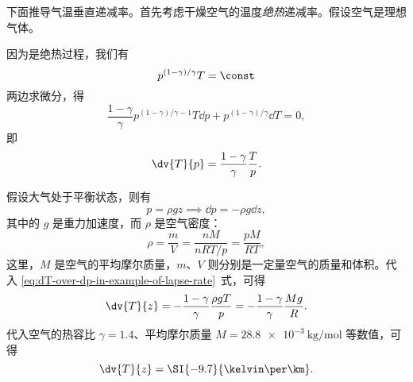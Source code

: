 \begin{example}[海拔与气温的关系]
  下面推导气温垂直递减率。首先考虑干燥空气的温度\emph{绝热}递减率。假设空气是理想气体。

  因为是绝热过程，我们有
  \begin{equation}
    p^{(1-\gamma) / \gamma} T = \const
  \end{equation}
  两边求微分，得
  \begin{equation}
    \frac{1-\gamma}{\gamma} p^{(1-\gamma)/\gamma-1} T \dd{p}
    + p^{(1-\gamma)/\gamma} \dd{T} = 0,
  \end{equation}
  即
  \begin{equation} \label{eq:dT-over-dp-in-example-of-lapse-rate}
    \dv{T}{p} = \frac{1-\gamma}{\gamma} \frac{T}{p}.
  \end{equation}

  假设大气处于平衡状态，则有
  \begin{equation}
    p = \rho gz \implies \dd{p} = -\rho g \dd{z},
  \end{equation}
  其中的 $g$ 是重力加速度，而 $\rho$ 是空气密度：
  \begin{equation}
    \rho = \frac{m}{V} = \frac{nM}{nRT/p} = \frac{pM}{RT},
  \end{equation}
  这里，$M$ 是空气的平均摩尔质量，$m$、$V$ 则分别是一定量空气的质量和体积。代入
  \eqref{eq:dT-over-dp-in-example-of-lapse-rate}~式，可得
  \begin{equation}
    \dv{T}{z} = -\frac{1-\gamma}{\gamma} \frac{\rho gT}{p}
    = -\frac{1-\gamma}{\gamma} \frac{Mg}{R}.
  \end{equation}
  代入空气的热容比 $\gamma=1.4$、平均摩尔质量 $M=\SI{28.8e-3}{\kg\per\mol}$ 等数值，可得
  \begin{equation}
    \dv{T}{z} = \SI{-9.7}{\kelvin\per\km}.
  \end{equation}


\end{example}
